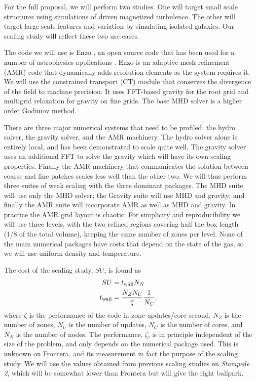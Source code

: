 For the full proposal, we will perform two studies.  One will target small scale
structures using simulations of driven magnetized turbulence.  The other will
target large scale features and variation by simulating isolated galaxies.  Our
scaling study will reflect these two use cases.  


The code we will use is Enzo \citep{Collins10,Bryan14}, an open source code that
has been used for a number of astrophysics applications
\citep{Abel02,CorreaMagnus23}.  Enzo is an adaptive mesh refinement (AMR) code
that dynamically adds resolution elements as the system requires it.  We will
use the constrained transport (CT) module \citep{Collins10} that conserves the
divergence of the field to machine precision.  It uses FFT-based gravity for the
root grid and multigrid relaxation for gravity on fine grids.  The base MHD
solver is a higher order Godunov method.  


There are three major numerical systems that need to be profiled:  the hydro
solver, the gravity solver, and the AMR machinery.  The hydro solver alone is
entirely local, and has been demonstrated to scale quite well.  The gravity
solver uses an additional FFT to solve the gravity which will have its own
scaling properties.  Finally the AMR machinery that communicates the solution
between coarse and fine patches scales less well than the other two.  We will
thus perform three suites of weak scaling with the three dominant packages.  The
MHD suite will use only the MHD solver; the Gravity suite will use MHD and
gravity; and finally the AMR suite will incorporate AMR as well as MHD and
gravity.  In practice the AMR grid layout is chaotic.  For simplicity and
reproducibility we will use three levels, with the two refined regions covering
half the box length (1/8 of the total volume), keeping the same number of zones
per level.  None of the main numerical packages have costs that depend on the
state of the gas, so we will use uniform density and temperature.

The cost of the scaling study, $SU$, is found as 
\begin{align}
SU &= t_{\rm{wall}} N_{N}\\
t_{\rm{wall}} &= \frac{N_{Z} N_{U}}{\zeta} \frac{1}{N_{C}},
\end{align}
where $\zeta$ is the performance of the code in zone-updates/core-second, $N_Z$
is the number of zones, $N_U$ is the number of updates, $N_{C}$ is the number of
cores, and $N_N$ is the number of nodes.  The performance, $\zeta$, is
in principle independent of the size of the problem, and only depends on the
numerical package used.  This is unknown on Frontera, and its measurement in fact the purpose
of the scaling study.  We will use the values obtained from previous scaling
studies on \emph{Stampede 2}, which will be somewhat lower than Frontera but
will give the right ballpark.  

